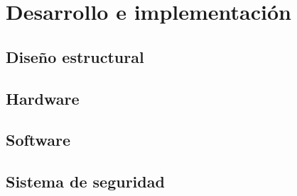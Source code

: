 
\chapter{Desarrollo e implementaci\'on} %

\label{Chapter4} %




\section{Dise\~no estructural}
\section{Hardware}
\section{Software}
\section{Sistema de seguridad}

